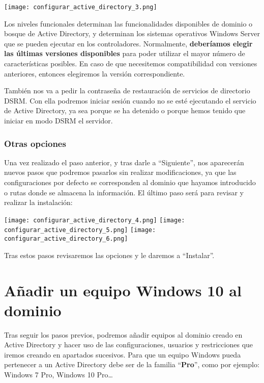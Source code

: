 \begin{center}
    \vspace{-15pt}
    \texttt{[image: configurar\_active\_directory\_3.png]}
    \vspace{-15pt}
\end{center}

Los niveles funcionales determinan las funcionalidades disponibles de dominio o bosque de Active Directory, y determinan los sistemas operativos Windows Server que se pueden ejecutar en los controladores. Normalmente, \textbf{deberíamos elegir las últimas versiones disponibles} para poder utilizar el mayor número de características posibles. En caso de que necesitemos compatibilidad con  versiones anteriores, entonces elegiremos la versión correspondiente.

También nos va a pedir la contraseña de restauración de servicios de directorio DSRM. Con ella podremos iniciar sesión cuando no se esté ejecutando el servicio de Active Directory, ya sea porque se ha detenido o porque hemos tenido que iniciar en modo DSRM el servidor.


\subsection{Otras opciones}
Una vez realizado el paso anterior, y tras darle a “Siguiente”, nos aparecerán nuevos pasos que podremos pasarlos sin realizar modificaciones, ya que las configuraciones por defecto se corresponden al dominio que hayamos introducido o rutas donde se almacena la información. El último paso será para revisar y realizar la instalación:

\begin{center}
    \vspace{-15pt}
    \texttt{[image: configurar\_active\_directory\_4.png]}
    \hfill
    \texttt{[image: configurar\_active\_directory\_5.png]}
    \hfill
    \texttt{[image: configurar\_active\_directory\_6.png]}
    \vspace{-15pt}
\end{center}

Tras estos pasos revisaremos las opciones y le daremos a “Instalar”.

\hypertarget{windows_client_dominio}{}
\chapter{Añadir un equipo Windows 10 al dominio}
Tras seguir los pasos previos, podremos añadir equipos al dominio creado en Active Directory y hacer uso de las configuraciones, usuarios y restricciones que iremos creando en apartados sucesivos. Para que un equipo Windows pueda pertenecer a un Active Directory debe ser de la familia “\textbf{Pro}”, como por ejemplo: Windows 7 Pro, Windows 10 Pro…

